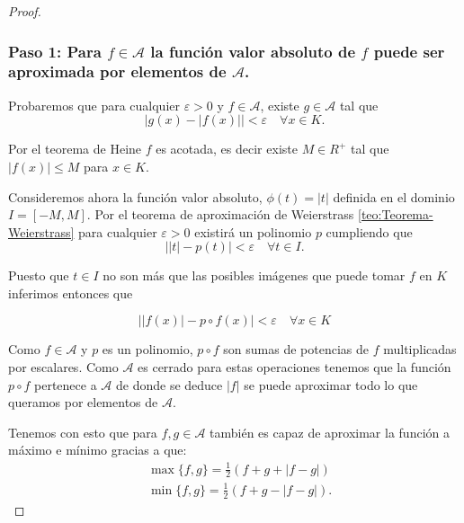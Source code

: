 \begin{proof}
    \subsubsection*{Paso 1: Para $f \in \mathcal{A}$ la función valor absoluto de $f$ puede ser aproximada por elementos
     de $\mathcal{A}$.}
    Probaremos que 
    para cualquier $\varepsilon > 0$ y $f \in \mathcal{A}$, 
    existe $g \in \mathcal{A}$  tal que 
    \begin{equation*}
        \big| g(x) - |f(x)|\big| < \varepsilon \quad \forall x \in K.
    \end{equation*}

     Por el teorema de Heine $f$ es acotada, es decir existe $M \in R^+$ tal que  $|f(x)| \leq M$ para $x \in K.$  

    Consideremos ahora la función valor absoluto, $\phi(t)=|t|$ definida en el dominio $I = [-M, M].$
    Por el teorema de aproximación de Weierstrass 
    \ref{teo:Teorema-Weierstrass}
    para cualquier $\varepsilon > 0$ 
    existirá un polinomio $p$ cumpliendo que 
    \begin{equation}
        \big||t|- p(t)\big| < \varepsilon \quad \forall t \in I.
    \end{equation}

    Puesto que $t \in I$ no son más que las posibles imágenes que puede tomar $f$ en $K$ inferimos entonces que 

    \begin{equation}
        \big||f(x)| - p \circ f(x)\big | < \varepsilon \quad \forall x \in K
    \end{equation}

    Como $f \in \mathcal{A}$ y $p$ es un polinomio, 
     $p \circ f$ son sumas de potencias  de $f$ multiplicadas por escalares.
    Como $\mathcal{A}$ es cerrado para estas operaciones tenemos que la función 
    $p \circ f$ pertenece a $\mathcal{A}$ de donde se deduce  
    $|f|$ se puede aproximar todo lo que queramos por elementos de $\mathcal{A}$. 

    Tenemos con esto que para $f,g \in \mathcal{A}$ también es capaz de aproximar la función
     a máximo e mínimo gracias a que:
    \begin{align} \label{eq:cerrado-min-max}
        & \max\{f,g\} = \frac{1}{2} (f+g+ |f-g|) \\
        & \min \{f,g\} = \frac{1}{2} (f+g -|f-g|). 
    \end{align}  
    


\end{proof}
